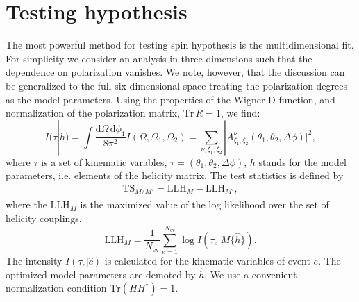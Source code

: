 \documentclass[prd,preprintnumbers,floatfix,
nofootinbib,superscriptaddress]{revtex4}
\newcommand{\diff}{\mathrm{d}}
\newcommand{\TS}{\mathrm{TS}}
\newcommand{\LLH}{\mathrm{LLH}}
\begin{document}
\section{Testing hypothesis} \label{sec:test.statistics}
The most powerful method for testing spin hypothesis is the multidimensional fit.
For simplicity we consider an analysis in three dimensions such that the dependence on polarization vanishes. We note, however, that the discussion can be generalized to the full six-dimensional space treating the polarization degrees as the model parameters.
Using the properties of the Wigner D-function, and normalization of
the polarization matrix, $\mathrm{Tr}\,R = 1$, we find:
\begin{equation} \label{eq:intensity.3}
  I(\tau|h) = \int \frac{\diff \Omega\,\diff \phi_1}{8\pi^2} I(\Omega,\Omega_1,\Omega_2) =
  \sum_{\nu,\xi_1,\xi_2} |A^{\nu}_{\xi_1,\xi_2}(\theta_1,\theta_2,\Delta\phi)|^2,
\end{equation}
where $\tau$ is a set of kinematic varables, $\tau = (\theta_1,\theta_2,\Delta\phi)$,
$h$ stands for the model parameters, i.e. elements of the helicity matrix.
The test statistics is defined by
\begin{align} \label{eq:test.statistics}
  \TS_{M/M'} = \LLH_M - \LLH_{M'},
\end{align}
where the $\LLH_M$ is the maximized value of the log likelihood over the set of helicity couplings.
\begin{equation} \label{eq:likelihood}
  \LLH_M = \frac{1}{N_\mathrm{ev}} \sum_{e=1}^{N_\mathrm{ev}} \log I(\tau_e|M\{\hat{h}\}).
\end{equation}
The intensity $I(\tau_e|\hat{c})$ is calculated for the kinematic variables of event $e$.
The optimized model parameters are demoted by $\hat{h}$. We use a convenient normalization condition $\mathrm{Tr}(HH^\dagger) = 1$.
%
\end{document}

